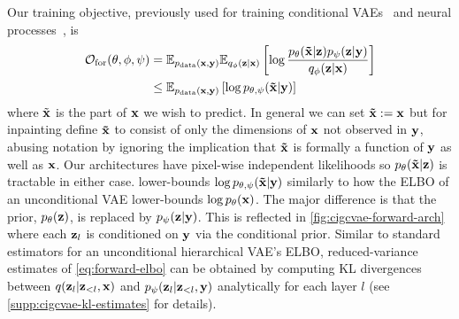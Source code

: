 Our training objective, previously used for training conditional
VAEs~\citep{sohn2015learning,ivanov2018variational} and neural
processes~\citep{garnelo2018neural}, is
\begin{align}
  \label{eq:forward-elbo}
  \mathcal{O}_\mathrm{for}(\theta, \phi, \psi) &= \mathbb{E}_{p_{\rm{data}}({\mathbf{x}}, {\mathbf{y}})} \mathbb{E}_{q_\phi({\mathbf{z}}|{\mathbf{x}})} \left[ \log \frac{p_\theta(\mathbf{\tilde{x}}|{\mathbf{z}})p_\psi({\mathbf{z}}|{\mathbf{y}})}{q_\phi({\mathbf{z}}|{\mathbf{x}})} \right] \\
  &\leq \mathbb{E}_{p_{\rm{data}}({\mathbf{x}}, {\mathbf{y}})} \left[ \log p_{\theta,\psi}(\mathbf{\tilde{x}}{}|{\mathbf{y}}) \right]
\end{align}
where $\tilde{{\mathbf{x}}}$ is the part of ${\mathbf{x}}$ we wish to predict. In general we can
set $\mathbf{\tilde{x}}{}:={\mathbf{x}}$ but for inpainting define $\mathbf{\tilde{x}}{}$ to consist of only
the dimensions of ${\mathbf{x}}$ not observed in ${\mathbf{y}}$, abusing notation by
ignoring the implication that $\mathbf{\tilde{x}}{}$ is formally a function of ${\mathbf{y}}$
as well as ${\mathbf{x}}$. Our architectures have pixel-wise independent
likelihoods so $p_\theta(\mathbf{\tilde{x}}{}|{\mathbf{z}})$ is tractable in either case. 
lower-bounds $\log p_{\theta,\psi}(\mathbf{\tilde{x}}{}|{\mathbf{y}}) $ similarly to how the ELBO of
an unconditional VAE lower-bounds $\log p_\theta({\mathbf{x}})$. The major difference
is that the prior, $p_\theta({\mathbf{z}})$, is replaced by $p_\psi({\mathbf{z}}|{\mathbf{y}})$.
This is reflected in \cref{fig:cigcvae-forward-arch} where each ${\mathbf{z}}_l$ is conditioned
on ${\mathbf{y}}$ via the conditional prior.
%
Similar to standard estimators for an unconditional hierarchical VAE's ELBO,
reduced-variance estimates of \cref{eq:forward-elbo} can be obtained by
computing KL divergences between $q({\mathbf{z}}_l|{\mathbf{z}}_{<l},{\mathbf{x}})$ and
$p_\psi({\mathbf{z}}_l|{\mathbf{z}}_{<l},{\mathbf{y}})$ analytically for each layer $l$ (see
\cref{supp:cigcvae-kl-estimates} for details).

